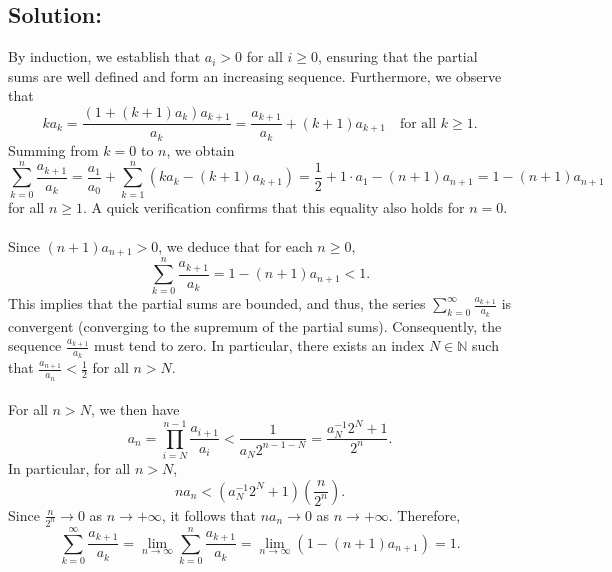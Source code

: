 \documentclass[11pt, a4paper, oneside]{article}
\newcommand{\solution}[1][]{\subsection*{#1}\hfill \par}
\theoremstyle{remark}
\theoremstyle{lemma}
\begin{document}
\solution[Solution:]  
By induction, we establish that \( a_i > 0 \) for all \( i \geq 0 \), ensuring that the partial sums are well defined and form an increasing sequence. Furthermore, we observe that  
\[
k a_k = \frac{(1 + (k+1)a_k) a_{k+1}}{a_k} = \frac{a_{k+1}}{a_k} + (k+1)a_{k+1} \quad \text{for all } k \geq 1.
\]
Summing from \( k = 0 \) to \( n \), we obtain  
\[
\sum_{k=0}^{n} \frac{a_{k+1}}{a_k} = \frac{a_1}{a_0} + \sum_{k=1}^{n} (k a_k - (k+1)a_{k+1}) = \frac{1}{2} + 1 \cdot a_1 - (n+1)a_{n+1} = 1 - (n+1)a_{n+1}
\]
for all \( n \geq 1 \). A quick verification confirms that this equality also holds for \( n = 0 \).  
\\\\
Since \( (n+1)a_{n+1} > 0 \), we deduce that for each \( n \geq 0 \),  
\[
\sum_{k=0}^{n} \frac{a_{k+1}}{a_k} = 1 - (n+1)a_{n+1} < 1.
\]
This implies that the partial sums are bounded, and thus, the series \( \sum_{k=0}^{\infty} \frac{a_{k+1}}{a_k} \) is convergent (converging to the supremum of the partial sums). Consequently, the sequence \( \frac{a_{k+1}}{a_k} \) must tend to zero. In particular, there exists an index \( N \in \mathbb{N} \) such that \( \frac{a_{n+1}}{a_n} < \frac{1}{2} \) for all \( n > N \).  
\\\\
For all \( n > N \), we then have  
\[
a_n = \prod_{i=N}^{n-1} \frac{a_{i+1}}{a_i} < \frac{1}{a_N 2^{n-1-N}} = \frac{a_N^{-1} 2^N + 1}{2^n}.
\]
In particular, for all \( n > N \),  
\[
n a_n < \left( a_N^{-1} 2^N + 1 \right) \left( \frac{n}{2^n} \right).
\]
Since \( \frac{n}{2^n} \to 0 \) as \( n \to +\infty \), it follows that \( n a_n \to 0 \) as $ n \to +\infty$. Therefore,  
\[
\sum_{k=0}^{\infty} \frac{a_{k+1}}{a_k} = \lim_{n \to \infty} \sum_{k=0}^{n} \frac{a_{k+1}}{a_k} = \lim_{n \to \infty} \left( 1 - (n+1)a_{n+1} \right) = 1.
\]
\end{document}
